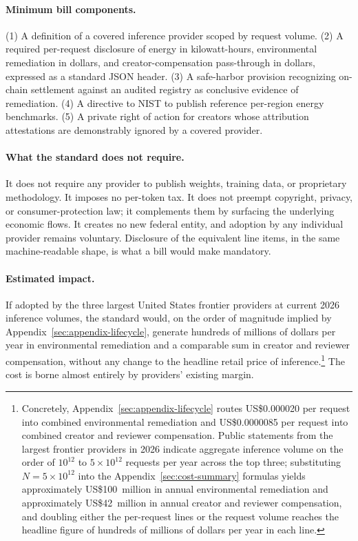 \documentclass[10pt,a4paper,twocolumn]{article}
\begin{document}
\paragraph{Minimum bill components.} (1) A definition of a covered inference provider scoped by request volume. (2) A required per-request disclosure of energy in kilowatt-hours, environmental remediation in dollars, and creator-compensation pass-through in dollars, expressed as a standard JSON header. (3) A safe-harbor provision recognizing on-chain settlement against an audited registry as conclusive evidence of remediation. (4) A directive to NIST to publish reference per-region energy benchmarks. (5) A private right of action for creators whose attribution attestations are demonstrably ignored by a covered provider.

\paragraph{What the standard does not require.} It does not require any provider to publish weights, training data, or proprietary methodology. It imposes no per-token tax. It does not preempt copyright, privacy, or consumer-protection law; it complements them by surfacing the underlying economic flows. It creates no new federal entity, and adoption by any individual provider remains voluntary. Disclosure of the equivalent line items, in the same machine-readable shape, is what a bill would make mandatory.

\paragraph{Estimated impact.} If adopted by the three largest United States frontier providers at current 2026 inference volumes, the standard would, on the order of magnitude implied by Appendix~\ref{sec:appendix-lifecycle}, generate hundreds of millions of dollars per year in environmental remediation and a comparable sum in creator and reviewer compensation, without any change to the headline retail price of inference.\footnote{Concretely, Appendix~\ref{sec:appendix-lifecycle} routes US\$0.000020 per request into combined environmental remediation and US\$0.0000085 per request into combined creator and reviewer compensation. Public statements from the largest frontier providers in 2026 indicate aggregate inference volume on the order of $10^{12}$ to $5 \times 10^{12}$ requests per year across the top three; substituting $N = 5 \times 10^{12}$ into the Appendix~\ref{sec:cost-summary} formulas yields approximately US\$100~million in annual environmental remediation and approximately US\$42~million in annual creator and reviewer compensation, and doubling either the per-request lines or the request volume reaches the headline figure of hundreds of millions of dollars per year in each line.} The cost is borne almost entirely by providers' existing margin.
\end{document}
